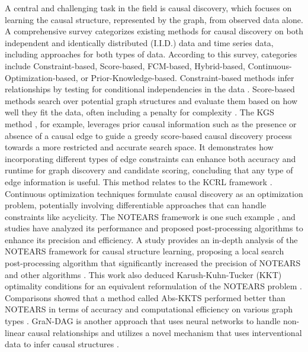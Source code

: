 A central and challenging task in the field is causal discovery, which focuses on learning the causal structure, represented by the graph, from observed data alone. A comprehensive survey categorizes existing methods for causal discovery on both independent and identically distributed (I.I.D.) data and time series data, including approaches for both types of data. According to this survey, categories include Constraint-based, Score-based, FCM-based, Hybrid-based, Continuous-Optimization-based, or Prior-Knowledge-based. Constraint-based methods infer relationships by testing for conditional independencies in the data \cite{Glymour2019Review, Spirtes2000Causation, Eberhardt2017Introduction}. Score-based methods search over potential graph structures and evaluate them based on how well they fit the data, often including a penalty for complexity \cite{Chickering2002Optimal}. The KGS method \cite{hasan2022kcrl}, for example, leverages prior causal information such as the presence or absence of a causal edge to guide a greedy score-based causal discovery process towards a more restricted and accurate search space. It demonstrates how incorporating different types of edge constraints can enhance both accuracy and runtime for graph discovery and candidate scoring, concluding that any type of edge information is useful. This method relates to the KCRL framework \cite{hasan2022kcrl}. Continuous optimization techniques formulate causal discovery as an optimization problem, potentially involving differentiable approaches that can handle constraints like acyclicity. The NOTEARS framework is one such example \cite{Zheng2018Dags}, and studies have analyzed its performance and proposed post-processing algorithms to enhance its precision and efficiency. A study provides an in-depth analysis of the NOTEARS framework for causal structure learning, proposing a local search post-processing algorithm that significantly increased the precision of NOTEARS and other algorithms \cite{hasan2024surveycausaldiscoverymethods}. This work also deduced Karush-Kuhn-Tucker (KKT) optimality conditions for an equivalent reformulation of the NOTEARS problem \cite{hasan2024surveycausaldiscoverymethods}. Comparisons showed that a method called Abs-KKTS performed better than NOTEARS in terms of accuracy and computational efficiency on various graph types \cite{hasan2024surveycausaldiscoverymethods}. GraN-DAG is another approach that uses neural networks to handle non-linear causal relationships and utilizes a novel mechanism that uses interventional data to infer causal structures \cite{gao2021dag}.


